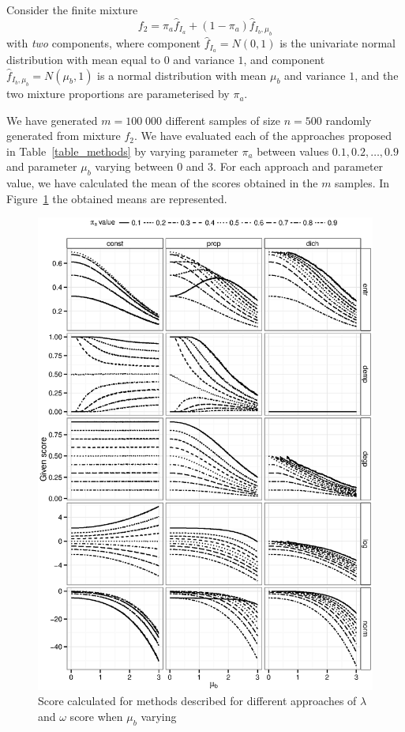 \documentclass[10pt, a4paper]{article}
\begin{document}
Consider the finite mixture
\begin{equation}\label{two_mixture}
f_2 = \pi_a \hat{f}_{I_a} + (1 - \pi_a) \hat{f}_{I_b, \mu_b}
\end{equation}
with \emph{two} components, where component $\hat{f}_{I_a} = N(0, 1)$ is the univariate normal distribution with mean equal to $0$ and variance $1$, and component $\hat{f}_{I_b, \mu_b} = N(\mu_b, 1)$ is a normal distribution with mean $\mu_b$ and variance $1$, and the two mixture proportions are parameterised by $\pi_a$.

We have generated $m=100\;000$ different samples of size $n=500$ randomly generated from mixture $f_2$. We have evaluated each of the approaches proposed in Table~\ref{table_methods} by varying parameter $\pi_a$ between values $0.1, 0.2, \dots, 0.9$ and parameter $\mu_b$ varying between $0$ and $3$. For each approach and parameter value, we have calculated the mean of the scores obtained in the $m$ samples. In Figure~\ref{fig:mu_varying} the obtained means are represented.

\begin{figure}[!t]
\centering
\includegraphics[scale=.5]{fig01all.eps}
\caption{Score calculated for methods described for different approaches of $\lambda$ and $\omega$ score when $\mu_b$ varying}
\label{fig:mu_varying}
\end{figure}
\end{document}
